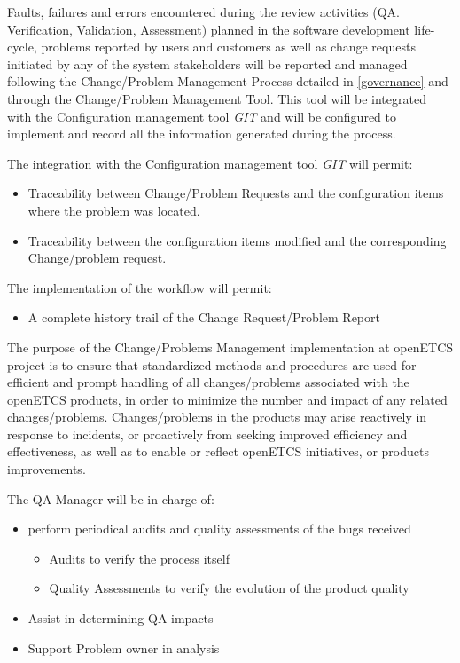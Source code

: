 \documentclass{template/openetcs_article}
\begin{document}
Faults, failures and errors encountered during the review activities (QA. Verification, Validation, Assessment) planned in the software development life-cycle, problems reported by users and customers as well as change requests initiated by any of the system stakeholders will be reported and managed following the Change/Problem Management Process  \citep{emp} detailed in \href{https://github.com/openETCS/governance/tree/master/Change-Problem%20Process}{[governance]} and through the Change/Problem Management Tool. This tool will be integrated with the Configuration management tool {\it GIT} and will be configured to implement and record all the information generated during the process.

The integration with the Configuration management tool {\it GIT} will permit:
\begin{itemize}
\item Traceability between Change/Problem Requests and the configuration items where the problem was located.
\item Traceability between the configuration items modified and the corresponding Change/problem request. 
\end{itemize}
 
The implementation of the workflow will permit:
\begin{itemize}
\item A complete history trail of the Change Request/Problem Report
\end{itemize}

The purpose of the Change/Problems Management implementation at openETCS project is to ensure that standardized methods and procedures are used for efficient and prompt handling of all changes/problems associated with the openETCS products, in order to minimize the number and impact of any related changes/problems. Changes/problems in the products may arise reactively in response to incidents, or proactively from seeking improved efficiency and effectiveness, as well as to enable or reflect openETCS initiatives, or products improvements.

The QA Manager will be in charge of:
\begin{itemize}
\item perform periodical audits and quality assessments of the bugs received
\begin{itemize}
\item Audits to verify the process itself
\item Quality Assessments to verify the evolution of the product quality
\end{itemize}
\item Assist in determining QA impacts
\item Support Problem owner in analysis
\end{itemize}
\end{document}
